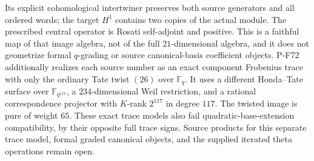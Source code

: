 \begin{description}
Its explicit cohomological intertwiner preserves both source
generators and all ordered words; the target $H^1$ contains two
copies of the actual module.  The prescribed central operator
is Rosati self-adjoint and positive.  This is a faithful map
of that image algebra, not of the full $21$-dimensional algebra,
and it does not geometrize formal $q$-grading or source
canonical-basis coefficient objects.
P-F72 additionally realizes each source number as an exact
component Frobenius trace with only the ordinary Tate twist
$(26)$ over $\mathbb F_q$.  It uses a different Honda--Tate
surface over $\mathbb F_{q^{117}}$, a $234$-dimensional Weil
restriction, and a rational correspondence projector with
$K$-rank $2^{117}$ in degree $117$.  The twisted image is
pure of weight $65$.  These exact trace models also fail
quadratic-base-extension compatibility, by their opposite full
trace signs.  Source products for this separate trace model,
formal graded canonical objects, and the supplied iterated
theta operations remain open.


\end{description}
